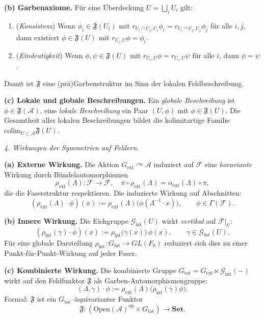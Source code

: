 \documentclass[10pt, letterpaper]{article}
\begin{document}
\textbf{(b) Garbenaxiome.}
Für eine Überdeckung $U=\bigcup_i U_i$ gilt:
\begin{enumerate}
\item (\emph{Konsistenz}) Wenn $\phi_i\in\mathfrak F(U_i)$ mit
$r_{U_i\cap U_j,U_i}\phi_i=r_{U_i\cap U_j,U_j}\phi_j$ für alle $i,j$,
dann existiert $\phi\in\mathfrak F(U)$ mit $r_{U_i,U}\phi=\phi_i$.
\item (\emph{Eindeutigkeit}) Wenn $\phi,\psi\in\mathfrak F(U)$ mit
$r_{U_i,U}\phi=r_{U_i,U}\psi$ für alle $i$, dann $\phi=\psi$.
\end{enumerate}
Damit ist $\mathfrak F$ eine (prä)Garbenstruktur im Sinn der lokalen Feldbeschreibung.

\textbf{(c) Lokale und globale Beschreibungen.}
Ein \emph{globale Beschreibung} ist $\phi\in\mathfrak F(\mathcal A)$,
eine \emph{lokale Beschreibung} ein Paar $(U,\phi)$ mit $\phi\in\mathfrak F(U)$.
Die Gesamtheit aller lokalen Beschreibungen bildet die kolimitartige Familie
$\mathrm{colim}_{U\subset\mathcal A}\mathfrak F(U)$.

\bigskip
\emph{4. Wirkungen der Symmetrien auf Feldern.}

\textbf{(a) Externe Wirkung.}
Die Aktion $G_{\mathrm{ext}}\curvearrowright\mathcal A$ induziert auf $\mathcal F$
eine \emph{kovariante} Wirkung durch Bündelautomorphismen
\[
\rho_{\mathrm{ext}}(\Lambda):\mathcal F\to \mathcal F,
\quad \pi\circ\rho_{\mathrm{ext}}(\Lambda)=\alpha_{\mathrm{ext}}(\Lambda)\circ\pi,
\]
die die Faserstruktur respektieren.  
Die induzierte Wirkung auf Abschnitten:
\[
(\rho_{\mathrm{ext}}(\Lambda)\cdot \phi)(x)
:=\rho_{\mathrm{ext}}(\Lambda)\big(\phi(\Lambda^{-1}\cdot x)\big),
\qquad \phi\in\Gamma(\mathcal F).
\]

\textbf{(b) Innere Wirkung.}
Die Eichgruppe $\mathcal G_{\mathrm{int}}(U)$ wirkt \emph{vertikal} auf
$\mathcal F|_U$:
\[
(\rho_{\mathrm{int}}(\gamma)\cdot \phi)(x)
:=\rho_{\mathrm{int}}\big(\gamma(x)\big)\,\phi(x),
\qquad \gamma\in\mathcal G_{\mathrm{int}}(U).
\]
Für eine globale Darstellung $\rho_{\mathrm{int}}:G_{\mathrm{int}}\to GL(F_0)$
reduziert sich dies zu einer Punkt-für-Punkt-Wirkung auf jeder Faser.

\textbf{(c) Kombinierte Wirkung.}
Die kombinierte Gruppe $G_{\mathrm{tot}}=G_{\mathrm{ext}}\ltimes\mathcal G_{\mathrm{int}}(-)$
wirkt auf den Feldfunktor $\mathfrak F$ als Garben-Automorphismengruppe:
\[
(\Lambda,\gamma)\cdot\phi
:=\rho_{\mathrm{ext}}(\Lambda)\big(\rho_{\mathrm{int}}(\gamma)\phi\big).
\]
Formal: $\mathfrak F$ ist ein $G_{\mathrm{tot}}$–äquivarianter Funktor
\[
\mathfrak F: (\mathrm{Open}(\mathcal A)^{\mathrm{op}}\times G_{\mathrm{tot}})\longrightarrow\mathbf{Set}.
\]
\end{document}
